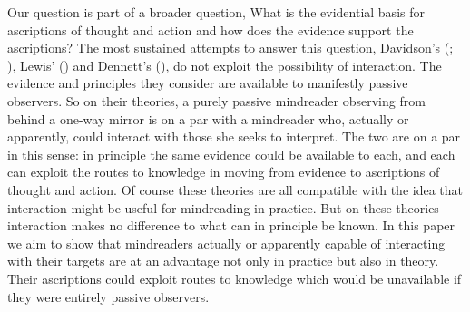 \documentclass[12pt,\papersize]{extarticle}
\begin{document}
Our question is part of a broader question,
What is the evidential basis for ascriptions of thought and action and how does the evidence support the ascriptions?
The most sustained attempts to answer this question,
Davidson's (\citeyear{Davidson:1984wh}; \citeyear{Davidson:1990du}), Lewis' (\citeyear{lewis:1974ri}) and Dennett's (\citeyear{Dennett:1987sf}),
do not exploit the possibility of interaction.
The evidence and principles they consider are available to manifestly passive observers.
So on their theories,
a purely passive mindreader observing from behind a one-way mirror
is on a par with
a mindreader who, actually or apparently, could interact with those she seeks to interpret.
The two are on a par in this sense:
in principle the same evidence could be available to each, and each can exploit the routes to knowledge in moving from evidence to ascriptions of thought and action.
Of course these theories are all compatible with the idea that interaction might be useful for mindreading in practice.  
But on these theories interaction makes no difference to what can in principle be known.
In this paper we aim to show
that mindreaders actually or apparently capable of interacting with their targets are at an advantage not only in practice but also in theory.
Their ascriptions could exploit routes to knowledge which would be unavailable if they were entirely passive observers.
\end{document}
